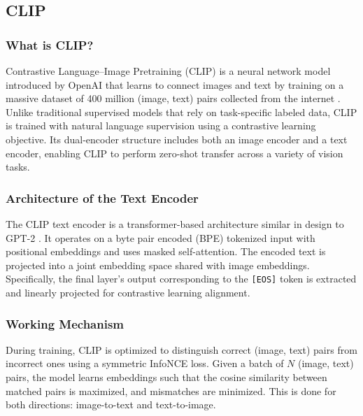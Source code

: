 \subsection{CLIP}

\subsubsection{What is CLIP?}
Contrastive Language–Image Pretraining (CLIP) is a neural network model introduced by OpenAI that learns to connect images and text by training on a massive dataset of 400 million (image, text) pairs collected from the internet \cite{radford2021learningtransferablevisualmodels}. Unlike traditional supervised models that rely on task-specific labeled data, CLIP is trained with natural language supervision using a contrastive learning objective. Its dual-encoder structure includes both an image encoder and a text encoder, enabling CLIP to perform zero-shot transfer across a variety of vision tasks.

\subsubsection{Architecture of the Text Encoder}
The CLIP text encoder is a transformer-based architecture similar in design to GPT-2 \cite{radford2021learningtransferablevisualmodels}. It operates on a byte pair encoded (BPE) tokenized input with positional embeddings and uses masked self-attention. The encoded text is projected into a joint embedding space shared with image embeddings. Specifically, the final layer's output corresponding to the \texttt{[EOS]} token is extracted and linearly projected for contrastive learning alignment.

\subsubsection{Working Mechanism}
During training, CLIP is optimized to distinguish correct (image, text) pairs from incorrect ones using a symmetric InfoNCE loss. Given a batch of $N$ (image, text) pairs, the model learns embeddings such that the cosine similarity between matched pairs is maximized, and mismatches are minimized. This is done for both directions: image-to-text and text-to-image.

